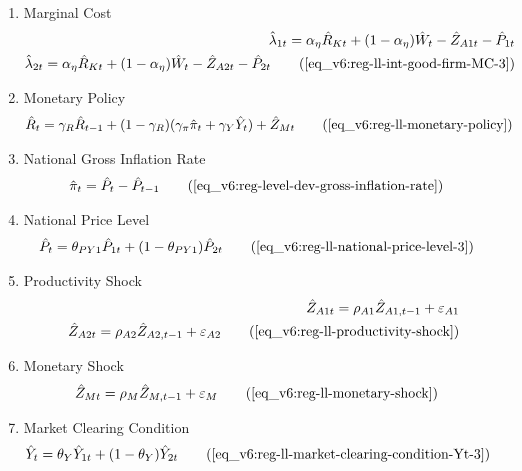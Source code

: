 \documentclass[../thesis.tex]{subfiles}
\begin{document}
{\begin{enumerate}
		
		\item Marginal Cost
		\begin{alignat}{2}
			\hat{\lambda}_{1 t} = {\alpha_{\eta}} \hat{R}_{Kt} + (1- {\alpha_{\eta}}) \hat{W}_{t} - \hat{Z}_{A1 t} - \hat{P}_{1 t} \nonumber \\
			\hat{\lambda}_{2 t} = {\alpha_{\eta}} \hat{R}_{Kt} + (1- {\alpha_{\eta}}) \hat{W}_{t} - \hat{Z}_{A2 t} - \hat{P}_{2 t} \tag{\ref{eq_v6:reg-ll-int-good-firm-MC-3}}
		\end{alignat}
		
		\item Monetary Policy
		\begin{align}
			& \hat{R}_t = \gamma_{R} \hat{R}_{t-1} + (1-\gamma_{R})(\gamma_{\pi} \hat{\pi}_t + \gamma_{Y} \hat{Y}_t) + \hat{Z}_{Mt} \tag{\ref{eq_v6:reg-ll-monetary-policy}}
		\end{align}
		
		\item National Gross Inflation Rate
		\begin{align}
			\hat{\pi}_{t} &= \hat{P}_{t} - \hat{P}_{t-1} \tag{\ref{eq_v6:reg-level-dev-gross-inflation-rate}}
		\end{align}
		
		\item National Price Level
		\begin{alignat}{2}
			\hat{P}_{t} &= \theta_{PY1} \hat{P}_{1t} + (1-\theta_{PY1}) \hat{P}_{2t} \tag{\ref{eq_v6:reg-ll-national-price-level-3}}
		\end{alignat}
		
		\item Productivity Shock
		\begin{alignat}{2}
			\hat{Z}_{A1 t} = \rho_{A1} \hat{Z}_{A1, t-1} + \varepsilon_{A1} \nonumber \\
			\hat{Z}_{A2 t} = \rho_{A2} \hat{Z}_{A2, t-1} + \varepsilon_{A2} \tag{\ref{eq_v6:reg-ll-productivity-shock}}
		\end{alignat}
		
		\item Monetary Shock
		\begin{alignat}{2}
			\hat{Z}_{Mt} &= \rho_M \hat{Z}_{M,t-1} + \varepsilon_{M} \tag{\ref{eq_v6:reg-ll-monetary-shock}}
		\end{alignat}
		
		\item Market Clearing Condition
		\begin{align}
			\hat{Y}_{t} &= \theta_{Y} \hat{Y}_{1t} + (1-\theta_{Y}) \hat{Y}_{2t} \tag{\ref{eq_v6:reg-ll-market-clearing-condition-Yt-3}}
		\end{align}
		

\end{enumerate}}
\end{document}
